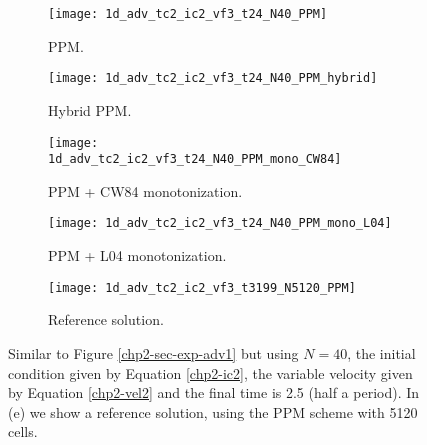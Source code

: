 \newpage

\begin{figure}[!htb]
  \centering
  \begin{subfigure}{0.49\textwidth}
    \centering
			\texttt{[image: 1d\_adv\_tc2\_ic2\_vf3\_t24\_N40\_PPM]}
			\caption{PPM.\label{chp2-sec-exp-adv5-a}}
  \end{subfigure}
  \begin{subfigure}{0.49\textwidth}
    \centering
			\texttt{[image: 1d\_adv\_tc2\_ic2\_vf3\_t24\_N40\_PPM\_hybrid]}
			\caption{Hybrid PPM.\label{chp2-sec-exp-adv5-b}}
  \end{subfigure}

  \begin{subfigure}{0.49\textwidth}
    \centering
		\texttt{[image: 1d\_adv\_tc2\_ic2\_vf3\_t24\_N40\_PPM\_mono\_CW84]}
    \caption{PPM + CW84 monotonization.\label{chp2-sec-exp-adv5-c}}
  \end{subfigure}
  \begin{subfigure}{0.49\textwidth}
    \centering
			\texttt{[image: 1d\_adv\_tc2\_ic2\_vf3\_t24\_N40\_PPM\_mono\_L04]}
      \caption{PPM + L04 monotonization.\label{chp2-sec-exp-adv5-d}}
  \end{subfigure} 

  \begin{subfigure}{0.49\textwidth}
    \centering
			\texttt{[image: 1d\_adv\_tc2\_ic2\_vf3\_t3199\_N5120\_PPM]}
      \caption{Reference solution.\label{chp2-sec-exp-adv5-e}}
  \end{subfigure} 
	\caption{ Similar to Figure \ref{chp2-sec-exp-adv1} but using $N=40$, 
	the initial condition given by Equation \eqref{chp2-ic2}, the variable velocity given by Equation
	\eqref{chp2-vel2} and the final time is 2.5 (half a period). In (e) we show a reference solution, using the PPM scheme with 
	5120 cells. \label{chp2-sec-exp-adv5}}
\end{figure}

\newpage


